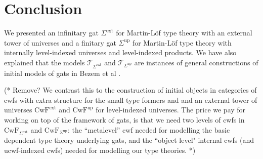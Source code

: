 \documentclass[11pt,a4paper]{article}
\theoremstyle{plain}
\theoremstyle{definition}
\newcommand{\T}{\mathsf{T}}
\def\leq{\mathrm{leq}}
\newcommand{\ty}{\mathrm{ty}}
\def\T{\mathcal{T}}
\def\CwF{\mathrm{CwF}}
\def\Sigmaext{{\Sigma^\mathrm{ext}}}
\def\Sigmaint{{\Sigma^\mathrm{up}}}
\begin{document}
\section{Conclusion}

We presented an infinitary gat $\Sigmaext$ for Martin-Löf type theory with an external tower of universes and a finitary gat $\Sigmaint$ for Martin-Löf type theory with internally level-indexed universes and level-indexed products. We have also explained that the models $\T_{\Sigmaext}$ and $\T_{\Sigmaint}$ are instances of general constructions of initial models of gats in
Bezem et al \cite{bezem:hofmann}.

(* Remove?
We contrast this to the construction of initial objects in categories of cwfs with extra structure for the small type formers and and an external tower of universes $\CwF^\mathrm{ext}$ and $\CwF^\mathrm{up}$ for level-indexed universes. %
The price we pay for working on top of the framework of gats, is that we need two levels of cwfs in $\CwF_{\Sigmaext}$ and  $\CwF_{\Sigmaint}$: the ``metalevel'' cwf needed for modelling the basic dependent type theory underlying gats,
and the ``object level" internal cwfs (and ucwf-indexed cwfs) needed for modelling our type theories. *)
%
\end{document}
